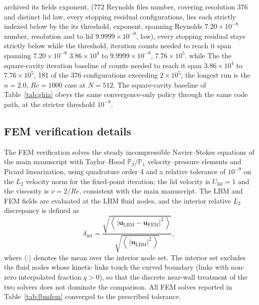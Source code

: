 \documentclass[11pt]{article}
\begin{document}
\color{revred}archived \color{revblue}its\color{black} \color{revred}fields \color{revblue}exponent,\color{black} \color{revred}(772 \color{revblue}Reynolds\color{black} \color{revred}files \color{revblue}number,\color{black} \color{revred}covering \color{revblue}resolution\color{black} \color{revred}376 \color{revblue}and\color{black} \color{revred}distinct \color{revblue}lid law, every stopping residual\color{black}
\color{revred}configurations, \color{revblue}lies\color{black} \color{revred}each \color{revblue}strictly\color{black} \color{revred}indexed \color{revblue}below\color{black} \color{revred}by \color{revblue}the\color{black} \color{revred}its \color{revblue}threshold,\color{black} \color{revred}exponent, \color{revblue}spanning\color{black} \color{revred}Reynolds \color{revblue}$7.20\times10^{-9}$\color{black} \color{revred}number, resolution and \color{revblue}to\color{black}
\color{revred}lid \color{revblue}$9.9999\times10^{-9}$,\color{black} \color{revred}law), every stopping residual stays strictly below \color{revblue}while\color{black} the \color{revred}threshold, \color{revblue}iteration counts needed to reach it span\color{black}
\color{revred}spanning $7.20\times10^{-9}$ \color{revblue}$3.86\times10^{4}$\color{black} to \color{revred}$9.9999\times10^{-9}$, \color{revblue}$7.76\times10^{5}$.\color{black} \color{revred}while \color{revblue}The\color{black} \color{revred}the \color{revblue}square-cavity\color{black} \color{revred}iteration \color{revblue}baseline of\color{black}
\color{revred}counts needed to reach it span $3.86\times10^{4}$ to $7.76\times10^{5}$, 181
\color{black}
\color{revred}of the 376 configurations exceeding $2\times10^{5}$; the longest run is the
\color{black}
\color{revred}$n=2.0$, $Re=1000$ case at $N=512$. The square-cavity baseline of
\color{black}
Table~\ref{tab:ghia} obeys the same convergence-only policy through the same
code path, at the stricter threshold $10^{-9}$.

\subsection{FEM verification details}
The FEM verification solves the steady incompressible Navier--Stokes
equations of the main manuscript with Taylor--Hood $\mathbb{P}_2/\mathbb{P}_1$
velocity--pressure elements and Picard linearization, using quadrature order
4 and a relative tolerance of $10^{-9}$ on the $L_2$ velocity norm for the
fixed-point iteration; the lid velocity is $U_{\mathrm{lid}}=1$ and the
viscosity is $\nu=2/Re$, consistent with the main manuscript. The LBM and FEM
fields are evaluated at the LBM fluid nodes, and the interior relative $L_2$
discrepancy is defined as
\[
\delta_{\mathrm{int}} =
\frac{\sqrt{\left\langle\,|\mathbf{u}_{\mathrm{LBM}}-\mathbf{u}_{\mathrm{FEM}}|^{2}\,\right\rangle}}
{\sqrt{\left\langle\,|\mathbf{u}_{\mathrm{LBM}}|^{2}\,\right\rangle}},
\]
where $\langle\cdot\rangle$ denotes the mean over the interior node set. The
interior set excludes the fluid nodes whose kinetic links touch the curved
boundary (links with non-zero interpolated fraction $q>0$), so that the
discrete near-wall treatment of the two solvers does not dominate the
comparison. All FEM solves reported in Table~\ref{tab:lbmfem} converged to the
prescribed tolerance.
\end{document}
